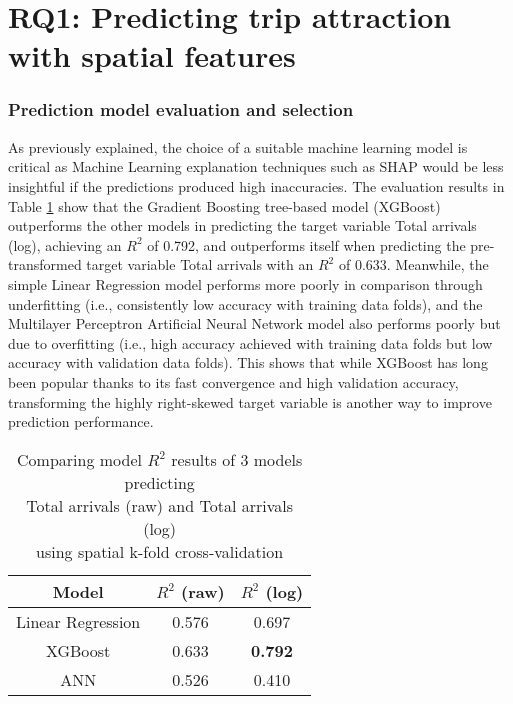 
\section*{RQ1: Predicting trip attraction with spatial features}
\subsubsection*{Prediction model evaluation and selection}

As previously explained, the choice of a suitable machine learning model is critical as Machine Learning explanation techniques such as SHAP would be less insightful if the predictions produced high inaccuracies. The evaluation results in Table \ref{tab:modeleval} show that the Gradient Boosting tree-based model (XGBoost) outperforms the other models in predicting the target variable Total arrivals (log), achieving an $R^2$ of 0.792, and outperforms itself when predicting the pre-transformed target variable Total arrivals with an $R^2$ of 0.633. Meanwhile, the simple Linear Regression model performs more poorly in comparison through underfitting (i.e., consistently low accuracy with training data folds), and the Multilayer Perceptron Artificial Neural Network model also performs poorly but due to overfitting (i.e., high accuracy achieved with training data folds but low accuracy with validation data folds). This shows that while XGBoost has long been popular thanks to its fast convergence and high validation accuracy, transforming the highly right-skewed target variable is another way to improve prediction performance. 

\begin{table}[ht]
    \centering
    \renewcommand{\arraystretch}{1.5}
    \begin{tabular}{|c|c|c|}
        \hline
        \rowcolor{lightgray}
        \textbf{Model} & \textbf{$R^2$ (raw)} & \textbf{$R^2$ (log)} \\
        \hline
        Linear Regression & 0.576 & 0.697 \\
        \rowcolor{pink}
        XGBoost & 0.633 & \textbf{0.792} \\
        ANN & 0.526 & 0.410\\
        \hline
    \end{tabular}
    \captionsetup{justification=centering}
    \caption{Comparing model $R^2$ results of 3 models predicting \\Total arrivals (raw) and Total arrivals (log) \\using spatial k-fold cross-validation}
    \label{tab:modeleval}
\end{table}

